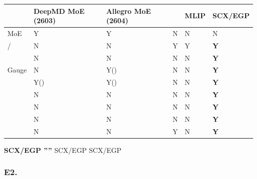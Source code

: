 \documentclass[
  12pt,
]{article}
\begin{document}
\begin{longtable}[]{@{}
  >{\raggedright\arraybackslash}p{}
  >{\centering\arraybackslash}p{}
  >{\centering\arraybackslash}p{}
  >{\centering\arraybackslash}p{}
  >{\centering\arraybackslash}p{}
  >{\centering\arraybackslash}p{}@{}}
\toprule\noalign{}
\begin{minipage}[b]{\linewidth}\raggedright

\end{minipage} & \begin{minipage}[b]{\linewidth}\centering
DeepMD MoE (2603)
\end{minipage} & \begin{minipage}[b]{\linewidth}\centering
Allegro MoE (2604)
\end{minipage} & \begin{minipage}[b]{\linewidth}\centering

\end{minipage} & \begin{minipage}[b]{\linewidth}\centering
MLIP 
\end{minipage} & \begin{minipage}[b]{\linewidth}\centering
SCX/EGP
\end{minipage} \\
\midrule\noalign{}
\endhead
\bottomrule\noalign{}
\endlastfoot
 MoE & Y & Y & N & N & N \\
/ & N & N & Y & Y & \textbf{Y} \\
 & N & N & N & N & \textbf{Y} \\
Gauge  & N & Y() & N & N & \textbf{Y} \\
 & Y() & Y() & N & N & \textbf{Y} \\
 & N & N & N & N & \textbf{Y} \\
 & N & N & N & N & \textbf{Y} \\
 & N & N & N & N & \textbf{Y} \\
 & N & N & Y & N & \textbf{Y} \\
\end{longtable}

\textbf{SCX/EGP ''''}
 SCX/EGP 
SCX/EGP 

\subsubsection{E2.
}\label{e2.-ux7adeux4e89ux98ceux9669ux7b49ux7ea7ux8bc4ux4f30}
\end{document}
